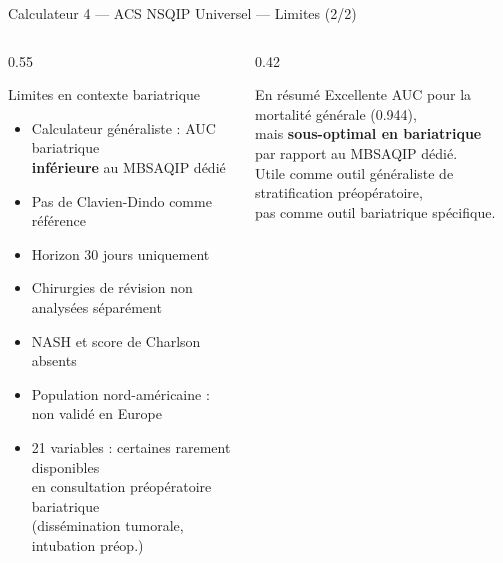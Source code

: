 \documentclass[aspectratio=169]{beamer}
\newcommand{\tightlist}{%
  \setlength{\itemsep}{1pt}\setlength{\parskip}{0pt}%
  \setlength{\parsep}{0pt}\setlength{\topsep}{2pt}}
\begin{document}
\begin{frame}{Calculateur 4 --- ACS NSQIP Universel --- Limites (2/2)}
  \begin{columns}[T]
    \begin{column}{0.55\textwidth}
      \begin{alertblock}{Limites en contexte bariatrique}
        \footnotesize\tightlist
        \begin{itemize}\tightlist
          \item Calculateur généraliste : AUC bariatrique\\
                \textbf{inférieure} au MBSAQIP dédié
          \item Pas de Clavien-Dindo comme référence
          \item Horizon 30 jours uniquement
          \item Chirurgies de révision non analysées séparément
          \item NASH et score de Charlson absents
          \item Population nord-américaine : non validé en Europe
          \item 21 variables : certaines rarement disponibles\\
                en consultation préopératoire bariatrique\\
                (dissémination tumorale, intubation préop.)
        \end{itemize}
      \end{alertblock}
    \end{column}
    \begin{column}{0.42\textwidth}
      \begin{block}{En résumé}
        \footnotesize
        Excellente AUC pour la mortalité générale (0.944),\\
        mais \textbf{sous-optimal en bariatrique}\\
        par rapport au MBSAQIP dédié.\\[6pt]
        Utile comme outil généraliste de\\
        stratification préopératoire,\\
        pas comme outil bariatrique spécifique.
      \end{block}
    \end{column}
  \end{columns}
\end{frame}
\end{document}
